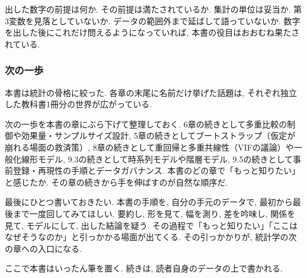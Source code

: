 出した数字の前提は何か. その前提は満たされているか. 集計の単位は妥当か. 第3変数を見落としていないか. データの範囲外まで延ばして語っていないか.
数字を出した後にこれだけ問えるようになっていれば, 本書の役目はおおむね果たされている.

\subsubsection*{次の一歩}

本書は統計の骨格に絞った.
各章の末尾に名前だけ挙げた話題は, それぞれ独立した教科書1冊分の世界が広がっている.

次の一歩を本書の章にぶら下げて整理しておく.
6章の続きとして多重比較の制御や効果量・サンプルサイズ設計, 5章の続きとしてブートストラップ（仮定が崩れる場面の救済策）, 8章の続きとして重回帰と多重共線性（VIFの議論）や一般化線形モデル, 9.3の続きとして時系列モデルや階層モデル, 9.5の続きとして事前登録・再現性の手順とデータガバナンス.
本書のどの章で「もっと知りたい」と感じたか. その章の続きから手を伸ばすのが自然な順序だ.

最後にひとつ書いておきたい.
本書の手順を, 自分の手元のデータで, 最初から最後まで一度回してみてほしい.
要約し, 形を見て, 幅を測り, 差を吟味し, 関係を見て, モデルにして, 出した結論を疑う.
その過程で「もっと知りたい」「ここはなぜそうなのか」と引っかかる場面が出てくる.
その引っかかりが, 統計学の次の章への入口になる.

ここで本書はいったん筆を置く. 続きは, 読者自身のデータの上で書かれる.

